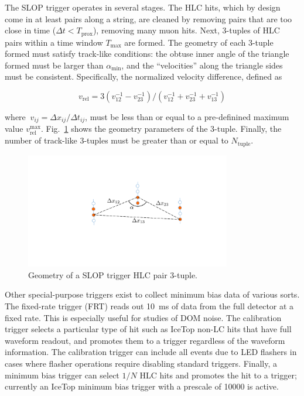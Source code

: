 The SLOP trigger operates in several stages.  The HLC hits, which by
design come in at least pairs along a string, are cleaned by removing pairs
that are too close in time ($\Delta t < T_{\mathrm{prox}}$), removing
many muon hits.  Next, 3-tuples of HLC pairs within a time window
$T_{\mathrm{max}}$ are formed.  The geometry of each
3-tuple formed must satisfy track-like conditions: the obtuse inner angle
of the triangle formed must be larger than $\alpha_{\mathrm{min}}$, and the
``velocities'' along the triangle sides must be consistent.  Specifically,
the normalized velocity difference, defined as

\begin{equation}
  v_{\mathrm{rel}} =
  3(v^{-1}_{12} - v^{-1}_{23})/(v^{-1}_{12} + v^{-1}_{23} +
  v^{-1}_{13})
\end{equation}

\noindent where $\ v_{ij} = \Delta x_{ij}/\Delta t_{ij}$, must be less than
or equal to a pre-definined maximum value
$v_{\mathrm{rel}}^{\mathrm{max}}$.  Fig.~\ref{fig:slop} 
shows the geometry parameters of the 3-tuple.  Finally, the number of track-like
3-tuples must be greater than or equal to $N_{\mathrm{tuple}}$.  

\begin{figure}[!h]
 \centering
 \includegraphics[width=0.8\textwidth]{graphics/online/trigger/slop.pdf}
 \caption{Geometry of a SLOP trigger HLC pair 3-tuple.}
 \label{fig:slop}
\end{figure}

Other special-purpose triggers exist to collect minimum bias data of
various sorts.  The fixed-rate trigger (FRT) reads out 10~ms of data
from the full detector at a fixed rate.  This is especially useful
for studies of DOM noise.  The calibration trigger
selects a particular type of hit such as IceTop 
non-LC hits that have full waveform readout, and promotes them to a
trigger regardless of the waveform information. The calibration
trigger can include all events due to LED flashers in cases
where flasher operations require disabling standard triggers. Finally, a minimum bias trigger
can select $1/N$ HLC hits and promotes the hit to a trigger; currently an
IceTop minimum bias trigger with a prescale of 10000 is active.

